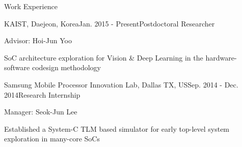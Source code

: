 \documentclass{resume} %
\begin{document}
\begin{section}{Work Experience}

\begin{subsection}{KAIST, Daejeon, Korea}{Jan. 2015 - Present}{Postdoctoral Researcher}{}
\item Advisor: Hoi-Jun Yoo
\item SoC architecture exploration for Vision \& Deep Learning in the hardware-software codesign methodology
\end{subsection}

\begin{subsection}{Samsung Mobile Processor Innovation Lab, Dallas TX, US}{Sep. 2014 - Dec. 2014}{Research Internship}{}
\item Manager: Seok-Jun Lee
\item Established a System-C TLM based simulator for early top-level system exploration  in many-core SoCs
\end{subsection}

\end{section}

\end{document}
